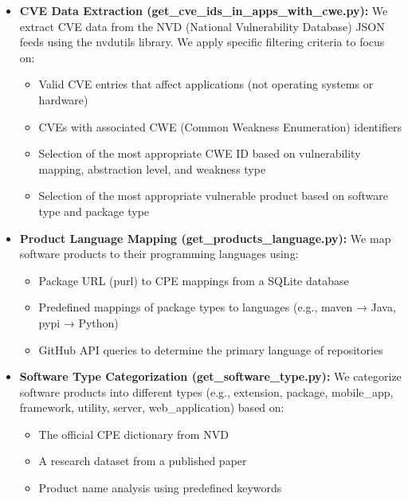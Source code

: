 \begin{itemize}
    \item \textbf{CVE Data Extraction (get\_cve\_ids\_in\_apps\_with\_cwe.py):} We extract CVE data from the NVD (National Vulnerability Database) JSON feeds using the nvdutils library. We apply specific filtering criteria to focus on:
    \begin{itemize}
        \item Valid CVE entries that affect applications (not operating systems or hardware)
        \item CVEs with associated CWE (Common Weakness Enumeration) identifiers
        \item Selection of the most appropriate CWE ID based on vulnerability mapping, abstraction level, and weakness type
        \item Selection of the most appropriate vulnerable product based on software type and package type
    \end{itemize}
    
    \item \textbf{Product Language Mapping (get\_products\_language.py):} We map software products to their programming languages using:
    \begin{itemize}
        \item Package URL (purl) to CPE mappings from a SQLite database
        \item Predefined mappings of package types to languages (e.g., maven → Java, pypi → Python)
        \item GitHub API queries to determine the primary language of repositories
    \end{itemize}
    
    \item \textbf{Software Type Categorization (get\_software\_type.py):} We categorize software products into different types (e.g., extension, package, mobile\_app, framework, utility, server, web\_application) based on:
    \begin{itemize}
        \item The official CPE dictionary from NVD
        \item A research dataset from a published paper
        \item Product name analysis using predefined keywords
    \end{itemize}
    

\end{itemize}
